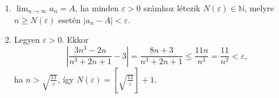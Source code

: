 \documentclass[11pt]{scrartcl}
\begin{document}
\begin{enumerate}
	\item $\lim_{n \to \infty} a_n = A$, ha minden $\varepsilon > 0$ számhoz
	      létezik $N(\varepsilon) \in \mathbb{N}$, melyre $n \ge N(\varepsilon)$
	      esetén $|a_n - A| < \varepsilon$.

	\item Legyen $\varepsilon > 0$. Ekkor
	      \[
		      \left| \frac{3n^3 - 2n}{n^3 + 2n + 1} - 3 \right|
		      = \frac{8n + 3}{n^3 + 2n + 1}
		      \le \frac{11n}{n^3}
		      = \frac{11}{n^2}
		      < \varepsilon,
	      \]
	      ha \(n > \sqrt{\frac{11}{\varepsilon}}\), így
	      \(
	      N(\varepsilon) = \left[ \sqrt{\frac{11}{\varepsilon}} \right] + 1
	      \).
\end{enumerate}
\end{document}
